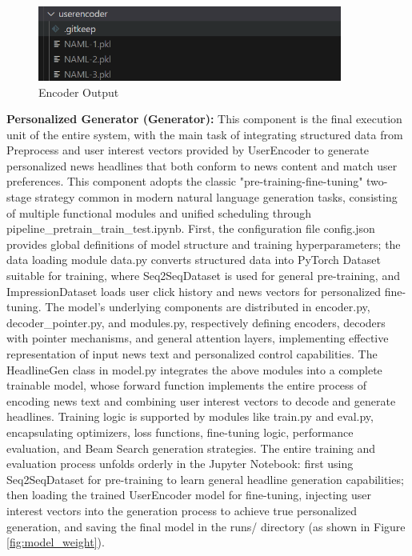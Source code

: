 \documentclass[10pt,a4paper]{article}
\begin{document}
\begin{figure}[H]
  \centering
  \includegraphics[width=10cm]{fig/user_encode.png}
  \caption{Encoder Output}\label{fig:user_encode}
\end{figure}

\textbf{Personalized Generator (Generator):}
This component is the final execution unit of the entire system, with the main task of integrating structured data from Preprocess and user interest vectors provided by UserEncoder to generate personalized news headlines that both conform to news content and match user preferences. This component adopts the classic "pre-training-fine-tuning" two-stage strategy common in modern natural language generation tasks, consisting of multiple functional modules and unified scheduling through pipeline\_pretrain\_train\_test.ipynb. First, the configuration file config.json provides global definitions of model structure and training hyperparameters; the data loading module data.py converts structured data into PyTorch Dataset suitable for training, where Seq2SeqDataset is used for general pre-training, and ImpressionDataset loads user click history and news vectors for personalized fine-tuning. The model's underlying components are distributed in encoder.py, decoder\_pointer.py, and modules.py, respectively defining encoders, decoders with pointer mechanisms, and general attention layers, implementing effective representation of input news text and personalized control capabilities. The HeadlineGen class in model.py integrates the above modules into a complete trainable model, whose forward function implements the entire process of encoding news text and combining user interest vectors to decode and generate headlines. Training logic is supported by modules like train.py and eval.py, encapsulating optimizers, loss functions, fine-tuning logic, performance evaluation, and Beam Search generation strategies. The entire training and evaluation process unfolds orderly in the Jupyter Notebook: first using Seq2SeqDataset for pre-training to learn general headline generation capabilities; then loading the trained UserEncoder model for fine-tuning, injecting user interest vectors into the generation process to achieve true personalized generation, and saving the final model in the runs/ directory (as shown in Figure \ref{fig:model_weight}).
\end{document}
